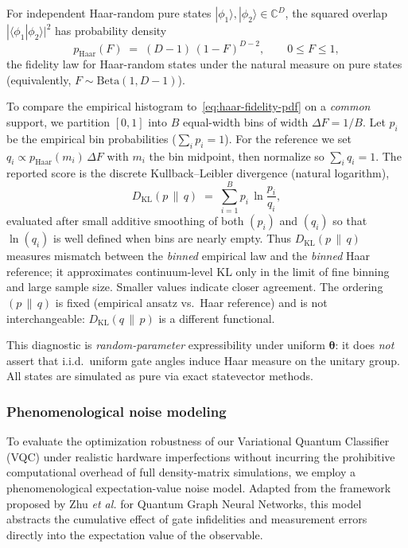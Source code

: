 \documentclass[11pt]{article}
\begin{document}
For independent Haar-random pure states $|\phi_{1}\rangle,|\phi_{2}\rangle \in \mathbb{C}^{D}$, the squared overlap $|\langle \phi_{1} | \phi_{2} \rangle|^{2}$ has probability density~\cite{zyczkowski2005}
\begin{equation}
\label{eq:haar-fidelity-pdf}
p_{\mathrm{Haar}}(F) \;=\; (D-1)\,(1-F)^{D-2}, \qquad 0 \le F \le 1,
\end{equation}
the fidelity law for Haar-random states under the natural measure on pure states (equivalently, $F \sim \mathrm{Beta}(1,D-1)$).

To compare the empirical histogram to~\eqref{eq:haar-fidelity-pdf} on a \emph{common} support, we partition $[0,1]$ into $B$ equal-width bins of width $\Delta F = 1/B$. Let $p_{i}$ be the empirical bin probabilities ($\sum_{i} p_{i}=1$). For the reference we set $q_{i} \propto p_{\mathrm{Haar}}(m_{i})\,\Delta F$ with $m_{i}$ the bin midpoint, then normalize so $\sum_{i} q_{i}=1$. The reported score is the discrete Kullback--Leibler divergence (natural logarithm),
\begin{equation}
\label{eq:kl-haar-fidelity}
D_{\mathrm{KL}}(p\,\|\,q) \;=\; \sum_{i=1}^{B} p_{i}\,\ln\frac{p_{i}}{q_{i}},
\end{equation}
evaluated after small additive smoothing of both $(p_{i})$ and $(q_{i})$ so that $\ln(q_{i})$ is well defined when bins are nearly empty. Thus $D_{\mathrm{KL}}(p\,\|\,q)$ measures mismatch between the \emph{binned} empirical law and the \emph{binned} Haar reference; it approximates continuum-level KL only in the limit of fine binning and large sample size. Smaller values indicate closer agreement. The ordering $(p\,\|\,q)$ is fixed (empirical ansatz vs.\ Haar reference) and is not interchangeable: $D_{\mathrm{KL}}(q\,\|\,p)$ is a different functional.

This diagnostic is \emph{random-parameter} expressibility under uniform $\boldsymbol{\theta}$: it does \emph{not} assert that i.i.d.\ uniform gate angles induce Haar measure on the unitary group. All states are simulated as pure via exact statevector methods.

\subsubsection{Phenomenological noise modeling}

To evaluate the optimization robustness of our Variational Quantum Classifier (VQC) under realistic hardware imperfections without incurring the prohibitive computational overhead of full density-matrix simulations, we employ a phenomenological expectation-value noise model. Adapted from the framework proposed by Zhu \textit{et al.} for Quantum Graph Neural Networks\cite{zhu2026}, this model abstracts the cumulative effect of gate infidelities and measurement errors directly into the expectation value of the observable.
\end{document}
